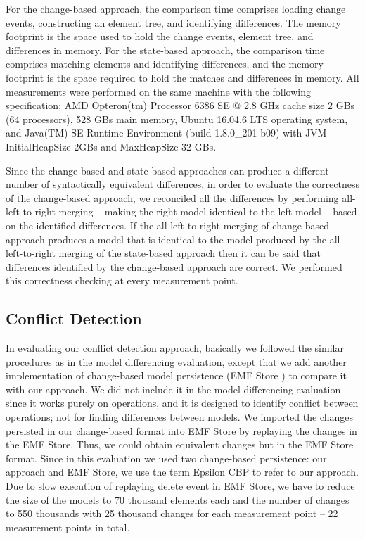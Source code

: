 For the change-based approach, the comparison time comprises loading change events, constructing an element tree, and identifying differences. The memory footprint is the space used to hold the change events, element tree, and differences in memory. For the state-based approach, the comparison time comprises matching elements and identifying differences, and the memory footprint is the space required to hold the matches and differences in memory. All measurements were performed on the same machine with the following specification: AMD Opteron(tm) Processor 6386 SE @ 2.8 GHz cache size 2 GBs (64 processors), 528 GBs main memory, Ubuntu 16.04.6 LTS operating system, and Java(TM) SE Runtime Environment (build 1.8.0\_201-b09) with JVM \textsf{InitialHeapSize} 2GBs and \textsf{MaxHeapSize} 32 GBs.

Since the change-based and state-based approaches can produce a different number of syntactically equivalent differences, in order to evaluate the correctness of the change-based approach, we reconciled all the differences by performing all-left-to-right merging -- making the right model identical to the left model -- based on the identified differences. If the all-left-to-right merging of change-based approach produces a model that is identical to the model produced by the all-left-to-right merging of the state-based approach then it can be said that differences identified by the change-based approach are correct. We performed this correctness checking at every measurement point.

\subsection{Conflict Detection}
\label{sec:conflict_detection_evaluation}
In evaluating our conflict detection approach, basically we followed the similar procedures as in the model differencing evaluation, except that we add another implementation of change-based model persistence (EMF Store \cite{koegel2010emfstore}) to compare it with our approach. We did not include it in the model differencing evaluation since it works purely on operations, and it is designed to identify conflict between operations; not for finding differences between models. We imported the changes persisted in our change-based format into EMF Store by replaying the changes in the EMF Store. Thus, we could obtain equivalent changes but in the EMF Store format. Since in this evaluation we used two change-based persistence: our approach and EMF Store, we use the term Epsilon CBP to refer to our approach. Due to slow execution of replaying \textsf{delete} event in EMF Store, we have to reduce the size of the models to 70 thousand elements each and the number of changes to 550 thousands with 25 thousand changes for each measurement point -- 22 measurement points in total.

